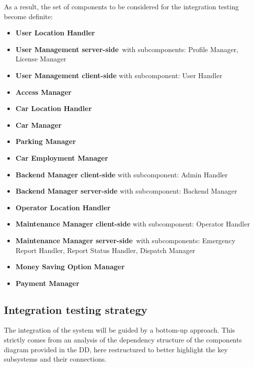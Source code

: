 	As a result, the set of components to be considered for the integration testing become definite:
	\begin{itemize}
		\item \textbf{User Location Handler}
		\item \textbf{User Management server-side} with subcomponents: Profile Manager, License Manager
		\item \textbf{User Management client-side} with subcomponent: User Handler
		\item \textbf{Access Manager}
		\item \textbf{Car Location Handler}
		\item \textbf{Car Manager}
		\item \textbf{Parking Manager}
		\item \textbf{Car Employment Manager}
		\item \textbf{Backend Manager client-side} with subcomponent: Admin Handler
		\item \textbf{Backend Manager server-side} with subcomponent: Backend Manager
		\item \textbf{Operator Location Handler}
		\item \textbf{Maintenance Manager client-side} with subcomponent: Operator Handler
		\item \textbf{Maintenance Manager server-side} with subcomponents: Emergency Report Handler, Report Status Handler, Dispatch Manager
		\item \textbf{Money Saving Option Manager}
		\item \textbf{Payment Manager}
	\end{itemize}
	

\subsection{Integration testing strategy}
\label{sec:integration_testing_strategy}
	The integration of the system will be guided by a bottom-up approach. This strictly comes from an analysis of the dependency structure of the components diagram provided in the DD, here restructured to better highlight the key subsystems and their connections.


